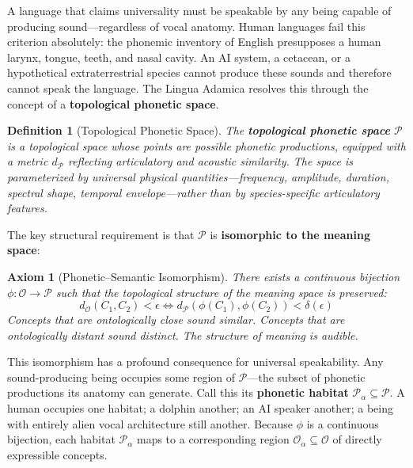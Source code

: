 \documentclass[12pt, letterpaper]{book}
\newtheorem{axiom}{Axiom}[chapter]
\newtheorem{definition}{Definition}[chapter]
\begin{document}
A language that claims universality must be speakable by any being capable of producing sound---regardless of vocal anatomy. Human languages fail this criterion absolutely: the phonemic inventory of English presupposes a human larynx, tongue, teeth, and nasal cavity. An AI system, a cetacean, or a hypothetical extraterrestrial species cannot produce these sounds and therefore cannot speak the language. The Lingua Adamica resolves this through the concept of a \textbf{topological phonetic space}.

\begin{definition}[Topological Phonetic Space]\label{def:phonetic-space}
The \textbf{topological phonetic space} $\mathcal{P}$ is a topological space whose points are possible phonetic productions, equipped with a metric $d_\mathcal{P}$ reflecting articulatory and acoustic similarity. The space is parameterized by universal physical quantities---frequency, amplitude, duration, spectral shape, temporal envelope---rather than by species-specific articulatory features.
\end{definition}

The key structural requirement is that $\mathcal{P}$ is \textbf{isomorphic to the meaning space}:

\begin{axiom}[Phonetic--Semantic Isomorphism]\label{ax:phon-sem}
There exists a continuous bijection $\phi: \mathcal{O} \to \mathcal{P}$ such that the topological structure of the meaning space is preserved:
\[
d_\mathcal{O}(C_1, C_2) < \epsilon \iff d_\mathcal{P}(\phi(C_1), \phi(C_2)) < \delta(\epsilon)
\]
Concepts that are ontologically close sound similar. Concepts that are ontologically distant sound distinct. The \textit{structure} of meaning is audible.
\end{axiom}

This isomorphism has a profound consequence for universal speakability. Any sound-producing being occupies some region of $\mathcal{P}$---the subset of phonetic productions its anatomy can generate. Call this its \textbf{phonetic habitat} $\mathcal{P}_\alpha \subseteq \mathcal{P}$. A human occupies one habitat; a dolphin another; an AI speaker another; a being with entirely alien vocal architecture still another. Because $\phi$ is a continuous bijection, each habitat $\mathcal{P}_\alpha$ maps to a corresponding region $\mathcal{O}_\alpha \subseteq \mathcal{O}$ of directly expressible concepts.
\end{document}
